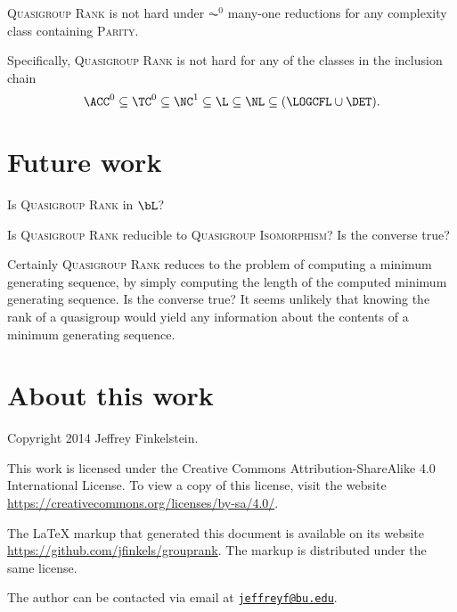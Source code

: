\documentclass{article}
\newcommand{\email}[1]{\href{mailto:#1}{\nolinkurl{#1}}}
\begin{document}
\begin{theorem}
  \textsc{Quasigroup Rank} is not hard under $\AC^0$ many-one reductions for any complexity class containing \textsc{Parity}.
\end{theorem}

Specifically, \textsc{Quasigroup Rank} is not hard for any of the classes in the inclusion chain
$$
\ACC^0 \subseteq \TC^0 \subseteq \NC^1 \subseteq \L \subseteq \NL \subseteq (\LOGCFL \cup \DET).
$$

\section{Future work}

Is \textsc{Quasigroup Rank} in $\bL$?

Is \textsc{Quasigroup Rank} reducible to \textsc{Quasigroup Isomorphism}?
Is the converse true?

Certainly \textsc{Quasigroup Rank} reduces to the problem of computing a minimum generating sequence, by simply computing the length of the computed minimum generating sequence.
Is the converse true?
It seems unlikely that knowing the rank of a quasigroup would yield any information about the contents of a minimum generating sequence.

\section{About this work}

Copyright 2014 Jef{}frey Finkelstein.

This work is licensed under the Creative Commons Attribution-ShareAlike 4.0 International License.
To view a copy of this license, visit the website \mbox{\url{https://creativecommons.org/licenses/by-sa/4.0/}}.

The \LaTeX{} markup that generated this document is available on its website \mbox{\url{https://github.com/jfinkels/grouprank}}.
The markup is distributed under the same license.

The author can be contacted via email at \email{jeffreyf@bu.edu}.

\printbibliography
\end{document}
